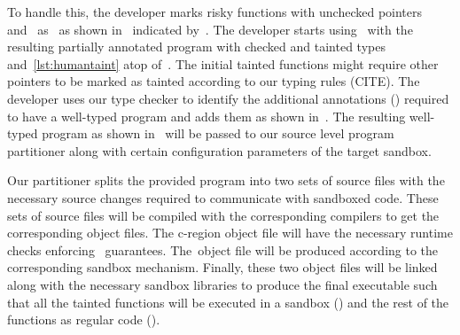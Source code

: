 
To handle this, the developer marks risky functions with unchecked pointers~\ie~ and~ as~ as shown in~ indicated by~\useradded.
The developer starts using~\systemname{} with the resulting partially annotated program with checked and tainted types~\ie~ and~\ref{lst:humantaint} atop of~.
The initial tainted functions might require other pointers to be marked as tainted according to our typing rules (CITE).
The developer uses our type checker to identify the additional annotations (\usermods) required to have a well-typed program and adds them as shown in~.
The resulting well-typed program as shown in~ will be passed to our source level program partitioner along with certain configuration parameters of the target sandbox.

Our partitioner splits the provided program into two sets of source files with the necessary source changes required to communicate with sandboxed code.
These sets of source files will be compiled with the corresponding compilers to get the corresponding object files.
The c-region object file will have the necessary runtime checks enforcing~\systemname{} guarantees.
The~\ucregion object file will be produced according to the corresponding sandbox mechanism.
Finally, these two object files will be linked along with the necessary sandbox libraries to produce the final executable such that all the tainted functions will be executed in a sandbox (\ucregion) and the rest of the functions as regular code (\cregion).


